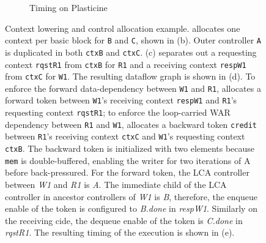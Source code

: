 \begin{figure}
\begin{subfigure}[b]{0.76\textwidth}
\caption{Timing on Plasticine}
\end{subfigure}
\caption[Context allocation and control allocation]{
  Context lowering and control allocation example.
  \name allocates one context per basic block for \texttt{B} and \texttt{C}, shown in (b). Outer controller \texttt{A} is
  duplicated in both \texttt{ctxB} and \texttt{ctxC}.
  (c) \name separates out a requesting context \texttt{rqstR1} from \texttt{ctxB} for \texttt{R1} 
  and a receiving context \texttt{respW1} from \texttt{ctxC} for \texttt{W1}.
  The resulting dataflow graph is shown in (d). 
  To enforce the forward data-dependency between \texttt{W1} and \texttt{R1}, 
  \name allocates a forward token between \texttt{W1}'s receiving context \texttt{respW1} and
  \texttt{R1}'s requesting context \texttt{rqstR1};
  to enforce the loop-carried WAR dependency between \texttt{R1} and \texttt{W1}, \name allocates a
  backward token \texttt{credit} between \texttt{R1}'s receiving context \texttt{ctxC} and 
  \texttt{W1}'s requesting context \texttt{ctxB}. 
  The backward token is initialized with two elements because \texttt{mem} is double-buffered,
  enabling the writer for two iterations of A before back-pressured.
  For the forward token, the LCA controller between \emph{W1} and \emph{R1} is \emph{A}. The
  immediate child of the LCA controller in ancestor controllers of \emph{W1} is \emph{B}, therefore,
  the enqueue enable of the token is configured to \emph{B.done} in \emph{respW1}. Similarly on the
  receiving cide, the dequeue enable of the token is \emph{C.done} in \emph{rqstR1}.
  The resulting timing of the execution is shown in (e).
}
\label{fig:contextalloc}
\end{figure}

